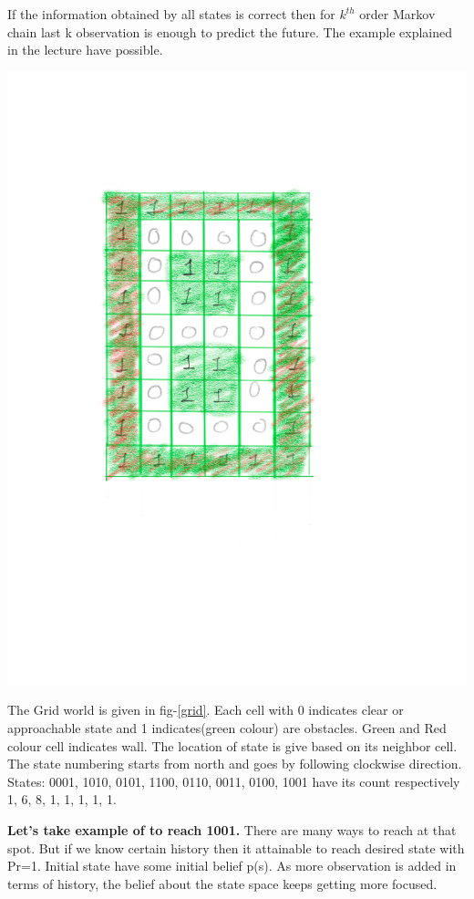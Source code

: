 \documentclass[solution,addpoints,12pt]{exam}
\begin{document}
\begin{questions}
\begin{solution}
If the information obtained by all states is correct then for $k^{th}$ order Markov chain last k observation is enough to predict the future.  
The example explained in the lecture have possible. 
\begin{center}
	\includegraphics[trim={10cm 20cm 19cm 14cm},clip,scale=0.2]{belief.png}\label{grid}
\end{center}

The Grid world is given in fig-\ref{grid}. Each cell with 0 indicates clear or approachable state and 1 indicates(green colour) are obstacles. Green and Red colour cell indicates wall. The location of state is give based on its neighbor cell. The state numbering starts from north and goes by following clockwise direction. States: 0001, 1010, 0101, 1100, 0110, 0011, 0100, 1001 have its count respectively 1, 6, 8, 1, 1, 1, 1, 1.

\textbf{Let's take example of to reach 1001.}  There are many ways to reach at that spot. But if we know certain history then it attainable to reach desired state with Pr=1. Initial state have some initial belief p(s). As more observation is added in terms of history, the belief about the state space keeps getting more focused.  


\end{solution}
\end{questions}
\end{document}

